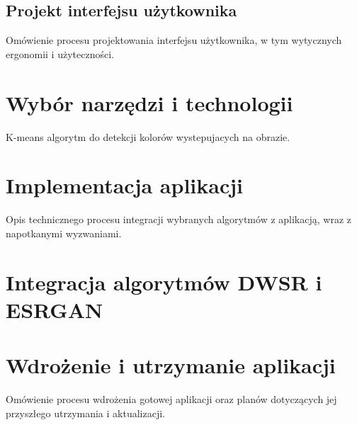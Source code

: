 \subsection*{Projekt interfejsu użytkownika}


Omówienie procesu projektowania interfejsu użytkownika, w tym wytycznych ergonomii i użyteczności.



\section{Wybór narzędzi i technologii}

K-means algorytm do detekcji kolorów wystepujacych na obrazie.


\section{Implementacja aplikacji}


Opis technicznego procesu integracji wybranych algorytmów z aplikacją, wraz z napotkanymi wyzwaniami.

\section{Integracja algorytmów DWSR i ESRGAN}


\section{Wdrożenie i utrzymanie aplikacji}

Omówienie procesu wdrożenia gotowej aplikacji oraz planów dotyczących jej przyszłego utrzymania i aktualizacji.
